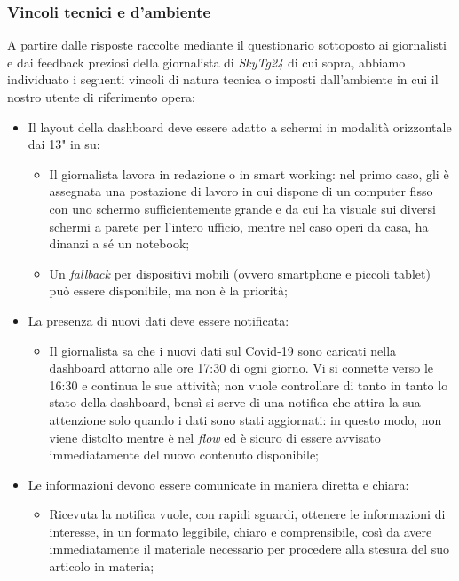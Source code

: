 \subsubsection{Vincoli tecnici e d'ambiente}
A partire dalle risposte raccolte mediante il questionario sottoposto ai giornalisti e dai feedback preziosi della giornalista di \emph{SkyTg24} di cui sopra, abbiamo individuato i seguenti vincoli di natura tecnica o imposti dall'ambiente in cui il nostro utente di riferimento opera:
\begin{itemize}
    \item Il layout della dashboard deve essere adatto a schermi in modalità orizzontale dai 13" in su:
    \begin{itemize}
        \item Il giornalista lavora in redazione o in smart working: nel primo caso, gli è assegnata una postazione di lavoro in cui dispone di un computer fisso con uno schermo sufficientemente grande e da cui ha visuale sui diversi schermi a parete per l'intero ufficio, mentre nel caso operi da casa, ha dinanzi a sé un notebook; 
        \item Un \textit{fallback} per dispositivi mobili (ovvero smartphone e piccoli tablet) può essere disponibile, ma non è la priorità;
    \end{itemize}
    \item La presenza di nuovi dati deve essere notificata:
    \begin{itemize}
        \item Il giornalista sa che i nuovi dati sul Covid-19 sono caricati nella dashboard attorno alle ore 17:30 di ogni giorno. Vi si connette verso le 16:30 e continua le sue attività; non vuole controllare di tanto in tanto lo stato della dashboard, bensì si serve di una notifica che attira la sua attenzione solo quando i dati sono stati aggiornati: in questo modo, non viene distolto mentre è nel \textit{flow} ed è sicuro di essere avvisato immediatamente del nuovo contenuto disponibile;
    \end{itemize}
	\item Le informazioni devono essere comunicate in maniera diretta e chiara:
	\begin{itemize}
        \item Ricevuta la notifica vuole, con rapidi sguardi, ottenere le informazioni di interesse, in un formato leggibile, chiaro e comprensibile, così da avere immediatamente il materiale necessario per procedere alla stesura del suo articolo in materia;
    \end{itemize}

\end{itemize}
